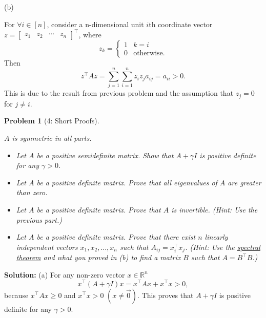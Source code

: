 \documentclass[11pt]{exam}
\theoremstyle{quest}
\newtheorem*{question}{Problem}
\begin{document}
(b)

For $\forall i \in [n]$, consider a n-dimensional unit $i$th coordinate vector $z = \begin{bmatrix} z_1 & z_2 & \cdots & z_n\end{bmatrix}^\top $, where 
\[ z_k =
  \begin{cases}
   1 & k = i \\
   0 &  \text{otherwise}.
  \end{cases}
\]
Then
\[
z^\top A z  =   \sum_{j=1}^n \sum_{i=1}^n z_iz_ja_{ij} = a_{ii} > 0.
\]
This is due to the result from previous problem and the assumption that $z_j = 0$ for $j \neq i$.

\newpage


\begin{question}[4: Short Proofs]
~

$A$ is symmetric in all parts.
\begin{itemize}
\item[(a)]
Let $A$ be a positive semidefinite matrix. Show that $A + \gamma I$ is positive
definite for any $\gamma > 0$.
\item[(b)]
Let $A$ be a positive definite matrix. Prove that all eigenvalues of $A$ are greater than zero.
\item[(c)]
Let $A$ be a positive definite matrix. Prove that $A$ is invertible. (Hint: Use the previous part.)
\item[(d)]
Let $A$ be a positive definite matrix. Prove that there exist $n$ linearly independent vectors $x_{1}, x_{2}, ..., x_{n}$
such that $A_{ij} = x_{i}^{\top}x_{j}$. (Hint: Use the
\href{https://inst.eecs.berkeley.edu/~ee127a/book/login/l_sym_sed.html}{\underline{spectral
    theorem}} and what you proved in (b) to find a matrix $B$ such that $A = B^{\top}B$.)
\end{itemize}
\end{question}
\textbf{Solution:}
(a) For any non-zero vector $x \in \mathbb{R}^n$
\[
x^\top (A + \gamma I) x = x^\top A x + x^\top x > 0 ,
\]
because $x^\top A x \ge 0$ and $x^\top x > 0$  $(x \neq \vec{0})$. This proves that $A + \gamma I$ is positive definite for any $\gamma > 0$.
\end{document}
